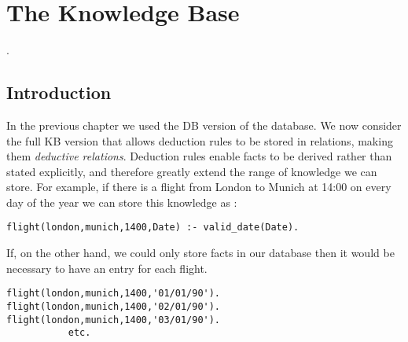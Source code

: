 %
% 
% 
% 
% 


\newpage

\chapter{The \eclipse Knowledge Base}.
\label{knowbase-sec}
\label{bang2}

\section{Introduction}

In the previous chapter we used the DB version of the \eclipse database.
We now consider the full KB
version that allows deduction rules to be stored
in relations, making them  {\em deductive relations}.
Deduction rules enable facts to be derived rather than 
stated explicitly, and therefore greatly extend the range
of knowledge we can store.
For example, if there is a flight  
from London to Munich at 14:00 on every day of the year 
we can store this knowledge
as :
\begin{verbatim}
flight(london,munich,1400,Date) :- valid_date(Date). 
\end{verbatim}

If, on the other hand, we could only store facts
in our database 
then it would be necessary to have an entry for each flight.
\begin{verbatim}
flight(london,munich,1400,'01/01/90'). 
flight(london,munich,1400,'02/01/90'). 
flight(london,munich,1400,'03/01/90'). 
           etc. 
\end{verbatim}


